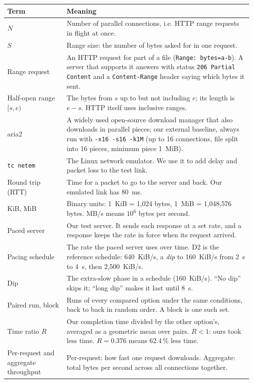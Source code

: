 \documentclass[11pt,a4paper]{report}
\newcommand{\code}[1]{\texttt{#1}}
\begin{document}
\begin{longtable}{@{}>{\raggedright\arraybackslash}p{3.6cm}>{\raggedright\arraybackslash}p{11.6cm}@{}}
\toprule
\textbf{Term} & \textbf{Meaning}\\
\midrule
\endhead
$N$ & Number of parallel connections, i.e. HTTP range requests in flight at once.\\
$S$ & Range size: the number of bytes asked for in one request.\\
Range request & An HTTP request for part of a file (\code{Range: bytes=a-b}). A server that supports it answers with status \code{206 Partial Content} and a \code{Content-Range} header saying which bytes it sent.\\
Half-open range $[s, e)$ & The bytes from $s$ up to but not including $e$; its length is $e - s$. HTTP itself uses inclusive ranges.\\
aria2 & A widely used open-source download manager that also downloads in parallel pieces; our external baseline, always run with \code{-x16 -s16 -k1M} (up to 16 connections, file split into 16 pieces, minimum piece 1~MiB).\\
\code{tc netem} & The Linux network emulator. We use it to add delay and packet loss to the test link.\\
Round trip (RTT) & Time for a packet to go to the server and back. Our emulated link has 80~ms.\\
KiB, MiB & Binary units: 1~KiB = 1{,}024 bytes, 1~MiB = 1{,}048{,}576 bytes. MB/s means $10^6$ bytes per second.\\
Paced server & Our test server. It sends each response at a set rate, and a response keeps the rate in force when its request arrived.\\
Pacing schedule & The rate the paced server uses over time. D2 is the reference schedule: 640~KiB/s, a \emph{dip} to 160~KiB/s from 2~s to 4~s, then 2{,}500~KiB/s.\\
Dip & The extra-slow phase in a schedule (160~KiB/s). ``No dip'' skips it; ``long dip'' makes it last until 8~s.\\
Paired run, block & Runs of every compared option under the same conditions, back to back in random order. A block is one such set.\\
Time ratio $R$ & Our completion time divided by the other option's, averaged as a geometric mean over pairs. $R < 1$: ours took less time. $R = 0.376$ means 62.4\,\% less time.\\
Per-request and aggregate throughput & Per-request: how fast one request downloads. Aggregate: total bytes per second across all connections together.\\

\end{longtable}
\end{document}
